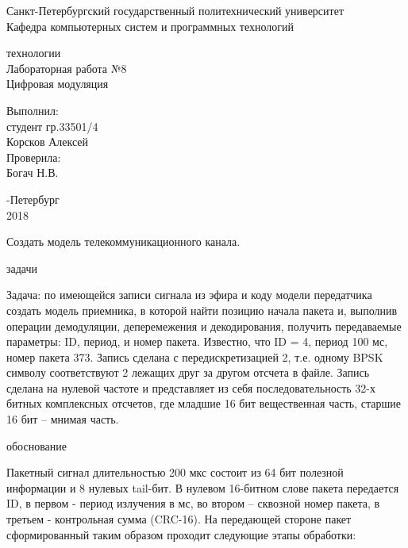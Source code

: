 \documentclass[a4paper,12pt]{article}
\begin{document}
\begin{center}
Санкт-Петербургский государственный политехнический университет
\\Кафедра компьютерных систем и программных технологий
\end{center}
\vspace*{10em plus .6em minus .5em}

\begin{center}
{ технологии
\\Лабораторная работа №8
\\Цифровая модуляция}
\end{center}

\vspace*{5em plus .6em minus .5em}
\begin{flushright}
Выполнил:\\студент гр.33501/4\\Корсков Алексей\\Проверила:\\Богач Н.В.
\end{flushright}

\vspace*{15em plus .6em minus .5em}
\begin{center}
{-Петербург
\\2018}
\end{center}
\pagestyle{empty}
\newpage
\pagestyle{plain}
{}

Создать модель телекоммуникационного канала.

{ задачи}

Задача: по имеющейся записи сигнала из эфира и коду модели передатчика создать модель приемника, в которой найти позицию начала пакета и, выполнив операции демодуляции, деперемежения и декодирования, получить передаваемые параметры: ID, период, и номер пакета. Известно, что ID = 4, период 100 мс, номер пакета 373. Запись сделана с передискретизацией 2, т.е. одному BPSK символу соответствуют 2 лежащих друг за другом отсчета в файле. Запись сделана на нулевой частоте и представляет из себя последовательность 32-х битных комплексных отсчетов, где младшие 16 бит вещественная часть, старшие 16 бит – мнимая часть.

{ обоснование}

Пакетный сигнал длительностью 200 мкс состоит из 64 бит полезной информации и 8 нулевых tail-бит. В нулевом 16-битном слове пакета передается ID, в первом - период излучения в мс, во втором – сквозной номер пакета, в третьем - контрольная сумма (CRC-16). На передающей стороне пакет сформированный таким образом проходит следующие этапы обработки:
\end{document}
